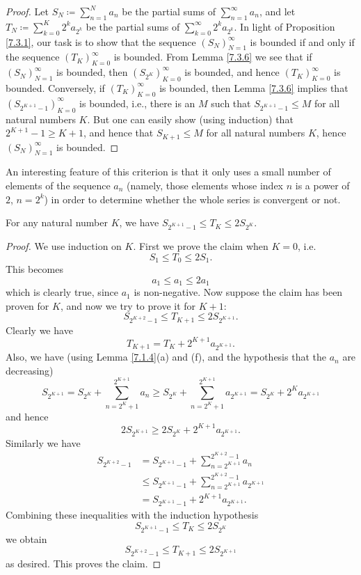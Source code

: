 \begin{proof}
Let \(S_N \coloneqq \sum_{n = 1}^N a_n\) be the partial sums of \(\sum_{n = 1}^\infty a_n\), and let \(T_N \coloneqq \sum_{k = 0}^K 2^k a_{2^k}\) be the partial sums of \(\sum_{k = 0}^\infty 2^k a_{2^k}\).
In light of Proposition \ref{7.3.1}, our task is to show that the sequence \((S_N)_{N = 1}^\infty\) is bounded if and only if the sequence \((T_K)_{K = 0}^\infty\) is bounded.
From Lemma \ref{7.3.6} we see that if \((S_N)_{N = 1}^\infty\) is bounded, then \((S_{2^K})_{K = 0}^\infty\) is bounded, and hence \((T_K)_{K = 0}^\infty\) is bounded.
Conversely, if \((T_K)_{K = 0}^\infty\) is bounded, then Lemma \ref{7.3.6} implies that \((S_{2^{K + 1} - 1})_{K = 0}^\infty\) is bounded, i.e., there is an \(M\) such that \(S_{2^{K + 1} - 1} \leq M\) for all natural numbers \(K\).
But one can easily show (using induction) that \(2^{K + 1} - 1 \geq K + 1\), and hence that \(S_{K + 1} \leq M\) for all natural numbers \(K\), hence \((S_N)_{N = 1}^\infty\) is bounded.
\end{proof}

\begin{remark}\label{7.3.5}
An interesting feature of this criterion is that it only uses a small number of elements of the sequence \(a_n\)
(namely, those elements whose index \(n\) is a power of \(2\), \(n = 2^k\))
in order to determine whether the whole series is convergent or not.
\end{remark}

\begin{lemma}\label{7.3.6}
For any natural number \(K\), we have \(S_{2^{K + 1} - 1} \leq T_K \leq 2S_{2^K}\).
\end{lemma}

\begin{proof}
We use induction on \(K\).
First we prove the claim when \(K = 0\), i.e.
\[
    S_1 \leq T_0 \leq 2S_1.
\]
This becomes
\[
    a_1 \leq a_1 \leq 2a_1
\]
which is clearly true, since \(a_1\) is non-negative.
Now suppose the claim has been proven for \(K\), and now we try to prove it for \(K + 1\):
\[
    S_{2^{K + 2} - 1} \leq T_{K + 1} \leq 2S_{2^{K + 1}}.
\]
Clearly we have
\[
    T_{K + 1} = T_K + 2^{K + 1} a_{2^{K + 1}}.
\]
Also, we have
(using Lemma \ref{7.1.4}(a) and (f), and the hypothesis that the \(a_n\) are decreasing)
\[
    S_{2^{K + 1}} = S_{2^K} + \sum_{n = 2^K + 1}^{2^{K + 1}} a_n \geq S_{2^K} + \sum_{n = 2^K + 1}^{2^{K + 1}} a_{2^{K + 1}} = S_{2^K} + 2^K a_{2^{K + 1}}
\]
and hence
\[
    2S_{2^{K + 1}} \geq 2S_{2^K} + 2^{K + 1} a_{2^{K + 1}}.
\]
Similarly we have
\begin{align*}
S_{2^{K + 2} - 1} &= S_{2^{K + 1} - 1} + \sum_{n = 2^{K + 1}}^{2^{K + 2} - 1} a_n \\
&\leq S_{2^{K + 1} - 1} + \sum_{n = 2^{K + 1}}^{2^{K + 2} - 1} a_{2^{K + 1}} \\
&= S_{2^{K + 1} - 1} + 2^{K + 1} a_{2^{K + 1}}.
\end{align*}
Combining these inequalities with the induction hypothesis
\[
    S_{2^{K + 1} - 1} \leq T_K \leq 2S_{2^K}
\]
we obtain
\[
    S_{2^{K + 2} - 1} \leq T_{K + 1} \leq 2S_{2^{K + 1}}
\]
as desired.
This proves the claim.
\end{proof}